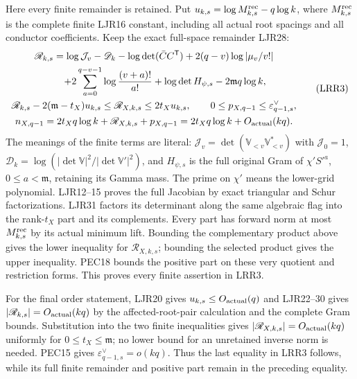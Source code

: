 \documentclass[11pt,a4paper]{article}
\begin{document}
Here every finite remainder is retained. Put
$u_{k,s}=\log M_{k,s}^{\rm rec}-q\log k$, where
$M_{k,s}^{\rm rec}$ is the complete finite LJR16 constant,
including all actual root spacings and all conductor coefficients.
Keep the exact full-space remainder LJR28:
\[
\begin{gathered}
 \mathscr R_{k,s}
 =\log\mathcal J_v-\mathscr D_k
 -\log\det(\bar C C^{\mathsf T})+2(q-v)\log|\mu_v/v!|\\
 \hspace{8mm}
 +2\sum_{a=0}^{q-v-1}\log\frac{(v+a)!}{a!}
 +\log\det H_{\psi,s}-2\mathfrak m q\log k,\\
 \mathscr R_{k,s}-2(\mathfrak m-t_X)u_{k,s}
 \le\mathscr R_{X,k,s}\le2t_Xu_{k,s},\qquad
 0\le p_{X,q-1}\le\varepsilon_{q-1,s}^{\vee},\\
 n_{X,q-1}
   =2t_Xq\log k+\mathscr R_{X,k,s}+p_{X,q-1}
   =2t_Xq\log k+O_{\rm actual}(kq).
\end{gathered}\tag{LRR3}
\]
The meanings of the finite terms are literal:
$\mathcal J_v=\det(\mathbb V_{<v}\mathbb V_{<v}^*)$ with
$\mathcal J_0=1$,
$\mathscr D_k=\log(|\det\mathbb V|^2/|\det\mathbb V'|^2)$,
and $H_{\psi,s}$ is the full original Gram of
$\chi'S'^a$, $0\le a<\mathfrak m$, retaining its Gamma mass.
The prime on $\chi'$ means the lower-grid polynomial.
LJR12--15 proves the full Jacobian by exact triangular and
Schur factorizations. LJR31 factors its determinant along the
same algebraic flag into the rank-$t_X$ part and its
complements. Every part has forward norm at most
$M_{k,s}^{\rm rec}$ by its actual minimum lift. Bounding the
complementary product above gives the lower inequality for
$\mathscr R_{X,k,s}$; bounding the selected product gives
the upper inequality. PEC18 bounds the positive part on
these very quotient and restriction forms. This proves
every finite assertion in LRR3.

For the final order statement, LJR20 gives
$u_{k,s}\le O_{\rm actual}(q)$ and LJR22--30 gives
$|\mathscr R_{k,s}|=O_{\rm actual}(kq)$ by the affected-root-pair
calculation and the complete Gram bounds. Substitution into
the two finite inequalities gives
$|\mathscr R_{X,k,s}|=O_{\rm actual}(kq)$ uniformly for
$0\le t_X\le\mathfrak m$; no lower bound for an
unretained inverse norm is needed. PEC15 gives
$\varepsilon_{q-1,s}^{\vee}=o(kq)$.
Thus the last equality in LRR3 follows, while its full finite
remainder and positive part remain in the preceding equality.
\end{document}
